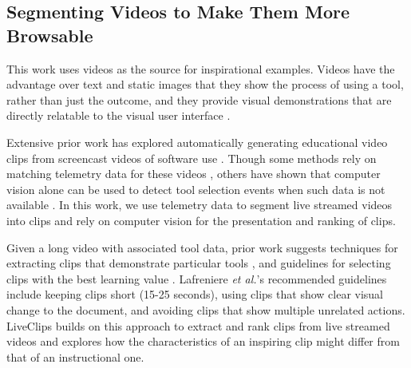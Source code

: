 \subsection{Segmenting Videos to Make Them More Browsable}
This work uses videos as the source for inspirational examples. Videos have the advantage over text and static images that they show the process of using a tool, rather than just the outcome, and they provide visual demonstrations that are directly relatable to the visual user interface \cite{Grossman2010a}.

Extensive prior work has explored automatically generating educational video clips from screencast videos of software use \cite{Pongnumkul2011, Chi2012, Banovic2012, Lafreniere2014, Nguyen2015}. Though some methods rely on matching telemetry data for these videos \cite{Grossman2010, Lafreniere2014, Chi2012}, others have shown that computer vision alone can be used to detect tool selection events when such data is not available \cite{Pongnumkul2011, Banovic2012}. In this work, we use telemetry data to segment live streamed videos into clips and rely on computer vision for the presentation and ranking of clips. 

Given a long video with associated tool data, prior work suggests techniques for extracting clips that demonstrate particular tools \cite{Pongnumkul2011, Chi2012, Lafreniere2014}, and guidelines for selecting clips with the best learning value \cite{Lafreniere2014}. Lafreniere \textit{et al.}'s recommended guidelines \cite{Lafreniere2014} include keeping clips short (15-25 seconds), using clips that show clear visual change to the document, and avoiding clips that show multiple unrelated actions. LiveClips builds on this approach to extract and rank clips from live streamed videos and explores how the characteristics of an inspiring clip might differ from that of an instructional one.
